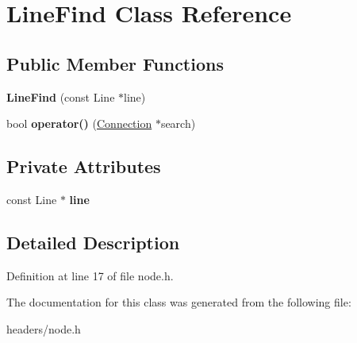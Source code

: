\hypertarget{classLineFind}{\section{Line\+Find Class Reference}
\label{classLineFind}
}
\subsection*{Public Member Functions}
\begin{DoxyCompactItemize}
\item 
\hypertarget{classLineFind_a3d82021934c4f169775ff547abb26f3d}{{\bfseries Line\+Find} (const Line $\ast$line)}\label{classLineFind_a3d82021934c4f169775ff547abb26f3d}

\item 
\hypertarget{classLineFind_a5c26eeb76e5e61254ea40ccc7e548ae1}{bool {\bfseries operator()} (\hyperlink{structConnection}{Connection} $\ast$search)}\label{classLineFind_a5c26eeb76e5e61254ea40ccc7e548ae1}

\end{DoxyCompactItemize}
\subsection*{Private Attributes}
\begin{DoxyCompactItemize}
\item 
\hypertarget{classLineFind_a6d7da994468b7665a43bd43f9e6c8c1f}{const Line $\ast$ {\bfseries line}}\label{classLineFind_a6d7da994468b7665a43bd43f9e6c8c1f}

\end{DoxyCompactItemize}


\subsection{Detailed Description}


Definition at line 17 of file node.\+h.



The documentation for this class was generated from the following file\+:\begin{DoxyCompactItemize}
\item 
headers/node.\+h\end{DoxyCompactItemize}

